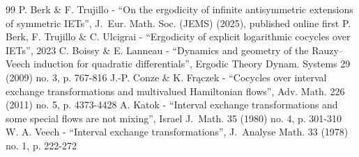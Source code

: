 \documentclass[10pt,a4paper]{article}
\theoremstyle{plain}
\theoremstyle{definition}
\begin{document}
\begin{thebibliography}{99}
 P. Berk \& F. Trujillo - “On the ergodicity of infinite antisymmetric extensions of symmetric IETs”, J. Eur. Math. Soc. (JEMS) (2025), published online first
 P. Berk, F. Trujillo \& C. Ulcigrai - “Ergodicity of explicit logarithmic cocycles over IETs”, 2023
 C. Boissy \& E. Lanneau - “Dynamics and geometry of the Rauzy–Veech induction for quadratic differentials”, Ergodic Theory Dynam. Systems 29 (2009) no. 3, p. 767-816
 J.-P. Conze \& K. Frączek - “Cocycles over interval exchange transformations and multivalued Hamiltonian flows”, Adv. Math. 226 (2011) no. 5, p. 4373-4428
 A. Katok - “Interval exchange transformations and some special flows are not mixing”, Israel J. Math. 35 (1980) no. 4, p. 301-310
 W. A. Veech - “Interval exchange transformations”, J. Analyse Math. 33 (1978) no. 1, p. 222-272
\end{thebibliography}
\end{document}
